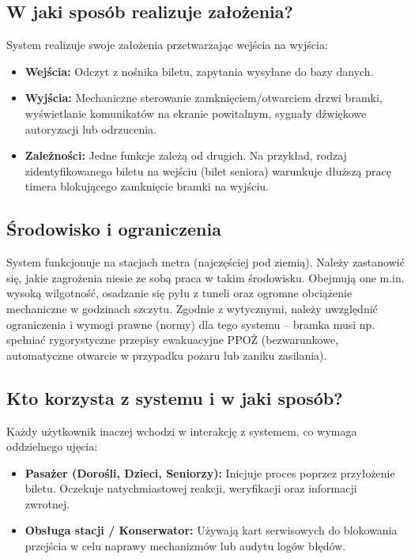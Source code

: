 \documentclass{article}
\begin{document}
\subsection*{W jaki sposób realizuje założenia?}
System realizuje swoje założenia przetwarzając wejścia na wyjścia:
\begin{itemize}
    \item \textbf{Wejścia:} Odczyt z nośnika biletu, zapytania wysyłane do bazy danych.
    \item \textbf{Wyjścia:} Mechaniczne sterowanie zamknięciem/otwarciem drzwi bramki, wyświetlanie komunikatów na ekranie powitalnym, sygnały dźwiękowe autoryzacji lub odrzucenia.
    \item \textbf{Zależności:} Jedne funkcje zależą od drugich. Na przykład, rodzaj zidentyfikowanego biletu na wejściu (bilet seniora) warunkuje dłuższą pracę timera blokującego zamknięcie bramki na wyjściu.
\end{itemize}

\subsection*{Środowisko i ograniczenia}
System funkcjonuje na stacjach metra (najczęściej pod ziemią). Należy zastanowić się, jakie zagrożenia niesie ze sobą praca w takim środowisku. Obejmują one m.in. wysoką wilgotność, osadzanie się pyłu z tuneli oraz ogromne obciążenie mechaniczne w godzinach szczytu. Zgodnie z wytycznymi, należy uwzględnić ograniczenia i wymogi prawne (normy) dla tego systemu – bramka musi np. spełniać rygorystyczne przepisy ewakuacyjne PPOŻ (bezwarunkowe, automatyczne otwarcie w przypadku pożaru lub zaniku zasilania).

\subsection*{Kto korzysta z systemu i w jaki sposób?}
Każdy użytkownik inaczej wchodzi w interakcję z systemem, co wymaga oddzielnego ujęcia:
\begin{itemize}
    \item \textbf{Pasażer (Dorośli, Dzieci, Seniorzy):} Inicjuje proces poprzez przyłożenie biletu. Oczekuje natychmiastowej reakcji, weryfikacji oraz informacji zwrotnej.
    \item \textbf{Obsługa stacji / Konserwator:} Używają kart serwisowych do blokowania przejścia w celu naprawy mechanizmów lub audytu logów błędów.
\end{itemize}
\end{document}
